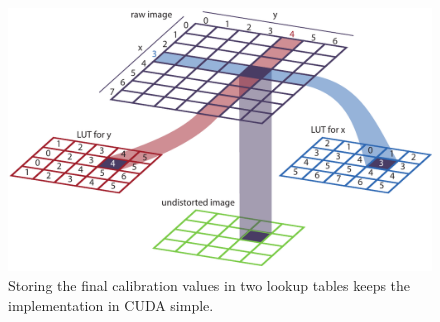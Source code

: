 \begin{figure}[H]
    \centering
    \includegraphics[width=1.0\textwidth]{images/undistort_LUT.pdf}
    \caption{Storing the final calibration values in two lookup tables keeps the implementation in CUDA simple.}
    \label{im:CudaCamCalib}
\end{figure}


